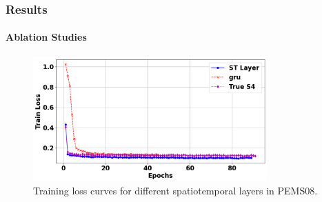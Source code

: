 \documentclass[light]{lutbeamer} %
\begin{document}
\begin{frame}
    \frametitle{Results}
    \framesubtitle{Ablation Studies}

    \begin{figure}[ht]
        \centering
        \includegraphics[width=0.8\textwidth]{figures/train_loss.png}
        \caption{Training loss curves for different spatiotemporal layers in PEMS08.}
    \end{figure}
\end{frame}
\end{document}
